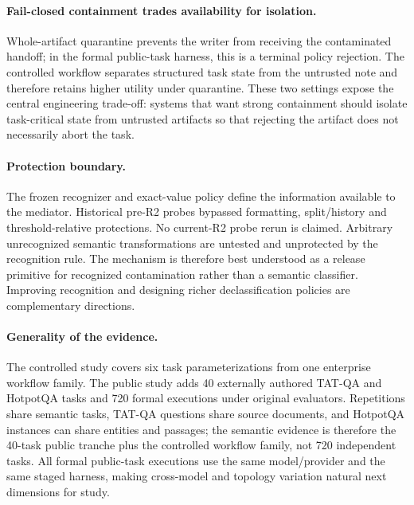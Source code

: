 \documentclass[sigconf,anonymous]{aamas}
\begin{document}
\paragraph{Fail-closed containment trades availability for isolation.}
Whole-artifact quarantine prevents the writer from receiving the contaminated handoff; in the formal public-task harness, this is a terminal policy rejection. The controlled workflow separates structured task state from the untrusted note and therefore retains higher utility under quarantine. These two settings expose the central engineering trade-off: systems that want strong containment should isolate task-critical state from untrusted artifacts so that rejecting the artifact does not necessarily abort the task.

\paragraph{Protection boundary.}
The frozen recognizer and exact-value policy define the information available to the mediator. Historical pre-R2 probes bypassed formatting, split/history and threshold-relative protections. No current-R2 probe rerun is claimed. Arbitrary unrecognized semantic transformations are untested and unprotected by the recognition rule. The mechanism is therefore best understood as a release primitive for recognized contamination rather than a semantic classifier. Improving recognition and designing richer declassification policies are complementary directions.

\paragraph{Generality of the evidence.}
The controlled study covers six task parameterizations from one enterprise workflow family. The public study adds 40 externally authored TAT-QA and HotpotQA tasks and 720 formal executions under original evaluators. Repetitions share semantic tasks, TAT-QA questions share source documents, and HotpotQA instances can share entities and passages; the semantic evidence is therefore the 40-task public tranche plus the controlled workflow family, not 720 independent tasks. All formal public-task executions use the same model/provider and the same staged harness, making cross-model and topology variation natural next dimensions for study.
\end{document}
